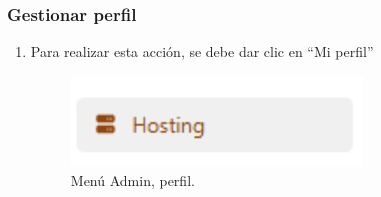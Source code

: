 \subsubsection {Gestionar perfil }

\begin{enumerate}
\item Para realizar esta acción, se debe dar clic en “Mi perfil”
\begin{figure}[H]
    \centering
    \includegraphics[width=0.3\linewidth]{guiamodulo/menu-admin-hosting.png}
    \caption{Menú Admin, perfil.}
    \label{fig:menu-admin-perfil}
\end{figure}
\end{enumerate}
